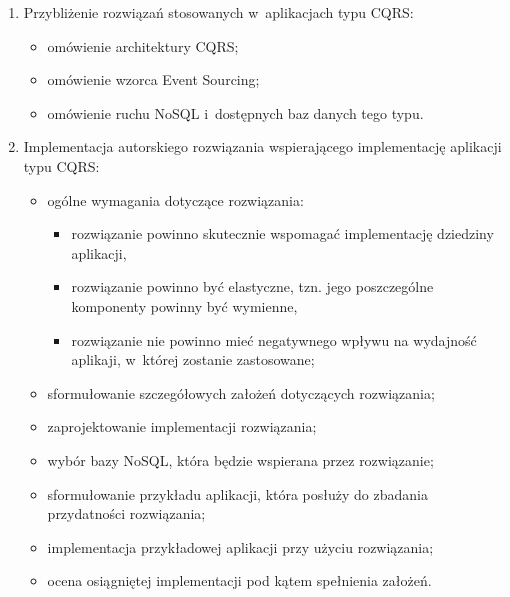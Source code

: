\begin{enumerate}

 \item Przybliżenie rozwiązań stosowanych w~aplikacjach typu CQRS:
  \begin{itemize}
   \item omówienie architektury CQRS;
   \item omówienie wzorca Event Sourcing;
   \item omówienie ruchu NoSQL i~dostępnych baz danych tego typu.
  \end{itemize}

 \item Implementacja autorskiego rozwiązania wspierającego implementację aplikacji typu CQRS:
  \begin{itemize}
   \item ogólne wymagania dotyczące rozwiązania:
    \begin{itemize}
     \item rozwiązanie powinno skutecznie wspomagać implementację dziedziny aplikacji,
     \item rozwiązanie powinno być elastyczne, tzn. jego poszczególne komponenty powinny być wymienne,
     \item rozwiązanie nie powinno mieć negatywnego wpływu na wydajność aplikaji, w~której zostanie zastosowane;
    \end{itemize}
   \item sformułowanie szczegółowych założeń dotyczących rozwiązania;
   \item zaprojektowanie implementacji rozwiązania;
   \item wybór bazy NoSQL, która będzie wspierana przez rozwiązanie;
   \item sformułowanie przykładu aplikacji, która posłuży do zbadania przydatności rozwiązania;
   \item implementacja przykładowej aplikacji przy użyciu rozwiązania;
   \item ocena osiągniętej implementacji pod kątem spełnienia założeń.
  \end{itemize}
 

\end{enumerate}

